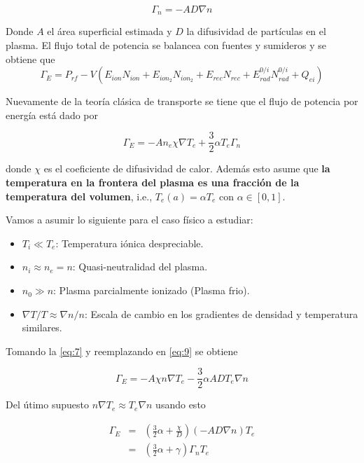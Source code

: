 \documentclass[11pt]{article}
\theoremstyle{definition}
\begin{document}
  \begin{equation}\label{eq:Gamma_n}
    \Gamma_n = -AD\nabla n
  \end{equation}

  Donde $A$ el \'area superficial estimada y $D$ la difusividad de part\'iculas en el plasma. El flujo total de potencia se balancea con fuentes y sumideros y se obtiene que 
  \begin{equation}\label{eq:8}
    \Gamma_E = P_{rf} - V(E_{ion}N_{ion} + E_{ion_2}N_{ion_2} + E_{rec}N_{rec} + E_{rad}^{0/i}N_{rad}^{0/i} + Q_{ei})
  \end{equation}

  Nuevamente de la teor\'ia cl\'asica de transporte se tiene que el flujo de potencia por energ\'ia est\'a dado por

  \begin{equation}\label{eq:9}
    \Gamma_E = -An_e\chi\nabla T_e + \frac{3}{2}\alpha T_e\Gamma_n
  \end{equation}

  donde $\chi$ es el coeficiente de difusividad de calor. Adem\'as esto asume que \textbf{la temperatura en la frontera del plasma es una fracci\'on de la temperatura del volumen}, i.e., $T_e(a) = \alpha T_e$ con $\alpha \in [0,1]$.
  
  Vamos a asumir lo siguiente para el caso f\'isico a estudiar:

  \begin{itemize}
    \item $T_i \ll T_e$: Temperatura i\'onica despreciable.
    \item $n_i \approx n_e = n$: Quasi-neutralidad del plasma.
    \item $n_0 \gg n$: Plasma parcialmente ionizado (Plasma frio).
    \item $\nabla T/ T \approx \nabla n / n$: Escala de cambio en los gradientes de densidad y temperatura similares.
  \end{itemize}
  
  Tomando la \eqref{eq:7} y reemplazando en \eqref{eq:9} se obtiene 

  \begin{equation}
    \Gamma_E = -A\chi n \nabla T_e - \frac{3}{2}\alpha ADT_e\nabla n
  \end{equation}

  Del \'utimo supuesto $n \nabla T_e \approx T_e \nabla n$ usando esto

  \begin{eqnarray}\label{eq:11}
    \Gamma_E &=& \left(\frac{3}{2}\alpha + \frac{\chi}{D}\right)(-AD\nabla n)T_e \nonumber \\
             &=& \left(\frac{3}{2}\alpha + \gamma\right)\Gamma_n T_e
  \end{eqnarray}
\end{document}
